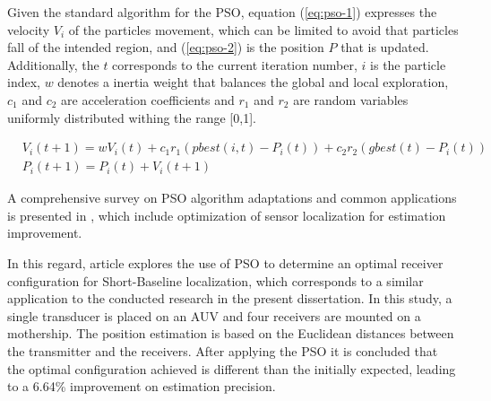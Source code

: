 Given the standard algorithm for the PSO, equation (\ref{eq:pso-1}) expresses the velocity $V_i$ of the particles movement, which can be limited to avoid that particles fall of the intended region, and (\ref{eq:pso-2}) is the position $P$ that is updated. Additionally, the $t$ corresponds to the current iteration number, $i$ is the particle index, $w$ denotes a inertia weight that balances the global and local exploration, $c_1$ and  $c_2$ are acceleration coefficients and $r_1$ and  $r_2$ are random variables uniformly distributed withing the range [0,1].

\begin{eqnarray}
& V_i(t+1) = w V_i(t) + c_1 r_1 (pbest(i,t) - P_i(t)) + c_2 r_2 (gbest(t) - P_i(t))
\label{eq:pso-1}\\
& P_i(t+1) = P_i(t) + V_i(t+1)
\label{eq:pso-2}
\end{eqnarray}

A comprehensive survey on PSO algorithm adaptations and common applications is presented in \cite{pso-surv}, which include optimization of sensor localization for estimation improvement. 

In this regard, article \cite{particle-swarm-opt} explores the use of PSO to determine an optimal receiver configuration for Short-Baseline localization, which corresponds to a similar application to the conducted research in the present dissertation. In this study, a single transducer is placed on an AUV and four receivers are mounted on a mothership. The position estimation is based on the Euclidean distances between the transmitter and the receivers. After applying the PSO it is concluded that the optimal configuration achieved is different than the initially expected, leading to a 6.64\% improvement on estimation precision.

